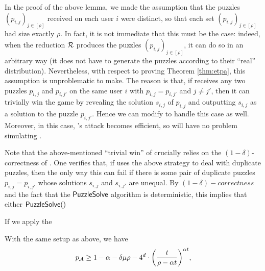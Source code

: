\begin{remark}\label{rem:puzzles}
  In the proof of the above lemma,
  we made the assumption that the puzzles \((p_{i,j})_{j \in [\rho]}\)
  received on each user \(i\) were distinct,
  so that each set \((p_{i,j})_{j \in [\rho]}\) had size exactly \(\rho\).
  In fact, it is not immediate that this must be the case:
  indeed, when the reduction \(\redR\) produces the puzzles \((p_{i,j})_{j \in [\rho]}\),
  it can do so in an arbitrary way (it does not have to generate the puzzles according to their ``real'' distribution).
  Nevertheless, with respect to proving Theorem \ref{thm:etpa},
  this assumption is unproblematic to make.
  The reason is that, if \advA receives any two puzzles \(p_{i,j}\) and \(p_{i,j'}\) on the same user
  \(i\) with \(p_{i,j} = p_{i,j'}\) and \(j \ne j'\),
  then it can trivially win the \ETPA game by revealing the solution \(s_{i,j}\) of \(p_{i,j}\)
  and outputting \(s_{i,j}\) as a solution to the puzzle \(p_{i,j'}\).
  Hence we can modify \advA to handle this case as well.
  Moreover, in this case, \advA's attack becomes efficient, so \redM will have no problem simulating \advA.

  Note that the above-mentioned ``trivial win'' of \advA crucially
  relies on the \((1-\delta)\)-correctness of \TP.
  One verifies that, if \advA uses the above strategy to deal with duplicate puzzles,
  then the only way this can fail if there is some pair of duplicate puzzles \(p_{i,j} = p_{i,j'}\)
  whose solutions \(s_{i,j}\) and \(s_{i,j'}\) are unequal.
  By \((1-\delta)-correctness\) and the fact that the \(\mathsf{PuzzleSolve}\) algorithm is deterministic,
  this implies that either \(\mathsf{PuzzleSolve}()\)

  If we apply the
\end{remark}

\begin{lemma}\label{lemma:A}
  With the same setup as above, we have
  \begin{equation}\label{ineq:A:lemma}
    p_{\advA} \ge 1 - \alpha - \delta \mu \rho
    - 4^{d} \cdot \left( \frac{t}{\rho - \alpha t} \right)^{\alpha t},
  \end{equation}
\end{lemma}

